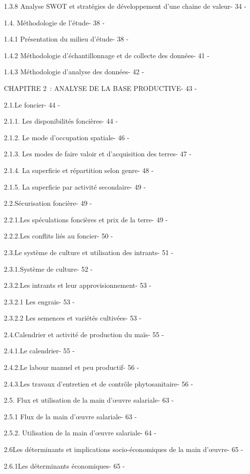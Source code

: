 \documentclass[12pt,oneside]{report}
\begin{document}
1.3.8 Analyse SWOT et stratégies de développement d’une chaine de valeur- 34 -

1.4. Méthodologie de l’étude- 38 -

1.4.1 Présentation du milieu d’étude- 38 -

1.4.2 Méthodologie d’échantillonnage et de collecte des données- 41 -

1.4.3 Méthodologie d’analyse des données- 42 -

CHAPITRE 2 : ANALYSE DE LA BASE PRODUCTIVE- 43 -

2.1.Le foncier- 44 -

2.1.1. Les disponibilités foncières- 44 -

2.1.2. Le mode d’occupation spatiale- 46 -

2.1.3. Les modes de faire valoir et d’acquisition des terres- 47 -

2.1.4. La superficie et répartition selon genre- 48 -

2.1.5. La superficie par activité secondaire- 49 -

2.2.Sécurisation foncière- 49 -

2.2.1.Les spéculations foncières et prix de la terre- 49 -

2.2.2.Les conflits liés au foncier- 50 -

2.3.Le système de culture et utilisation des intrants- 51 -

2.3.1.Système de culture- 52 -

2.3.2.Les intrants et leur approvisionnement- 53 -

2.3.2.1 Les engrais- 53 -

2.3.2.2 Les semences et variétés cultivées- 53 -

2.4.Calendrier et activité de production du maïs- 55 -

2.4.1.Le calendrier- 55 -

2.4.2.Le labour manuel et peu productif- 56 -

2.4.3.Les travaux d’entretien et de contrôle phytosanitaire- 56 -

2.5. Flux et utilisation de la main d’œuvre salariale- 63 -

2.5.1 Flux de la main d’œuvre salariale- 63 -

2.5.2. Utilisation de la main d’œuvre salariale- 64 -

2.6Les déterminants et implications socio-économiques de la main d’œuvre- 65 -

2.6.1Les déterminants économiques- 65 -
\end{document}
